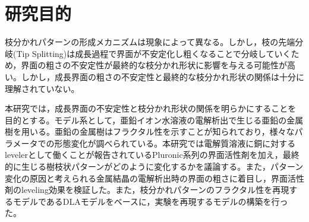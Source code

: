 \documentclass[autodetect-engine,dvipdfmx-if-dvi,a4paper,ja=standard]{bxjsbook}
\begin{document}

\thispagestyle{empty}

\restoregeometry
{}

\tableofcontents
{}






\section{研究目的}
枝分かれパターンの形成メカニズムは現象によって異なる。しかし，枝の先端分岐(Tip Splitting)は成長過程で界面が不安定化し粗くなることで分岐していくため，界面の粗さの不安定性が最終的な枝分かれ形状に影響を与える可能性が高い。しかし，成長界面の粗さの不安定性と最終的な枝分かれ形状の関係は十分に理解されていない。

本研究では，成長界面の不安定性と枝分かれ形状の関係を明らかにすることを目的とする。モデル系として，亜鉛イオン水溶液の電解析出で生じる亜鉛の金属樹を用いる。亜鉛の金属樹はフラクタル性を示すことが知られており\cite{matsushita1984fractal}，様々なパラメータでの形態変化が調べられている\cite{suda2003temperature}。本研究では電解質溶液に銅に対するlevelerとして働くことが報告されているPluronic系列の界面活性剤\cite{gallaway2008peg}\cite{wu2025decoding}を加え，最終的に生じる樹枝状パターンがどのように変化するかを議論する。また，パターン変化の原因と考えられる金属結晶の電解析出時の界面の粗さに着目し，界面活性剤のleveling効果を検証した。また，枝分かれパターンのフラクタル性を再現するモデルであるDLAモデル\cite{witten1981diffusion}をベースに，実験を再現するモデルの構築を行った。




















\end{document}
